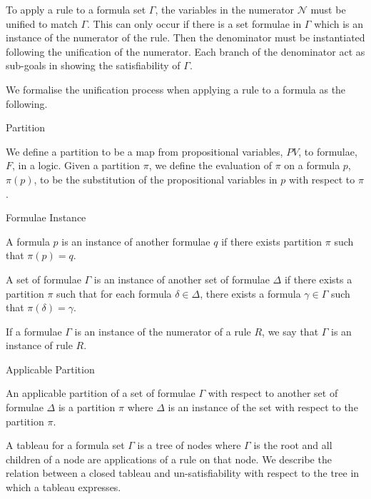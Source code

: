 \documentclass{llncs}
\begin{document}
To apply a rule to a formula set $\Gamma$, the variables in the numerator
$\mathcal{N}$ must be unified to match $\Gamma$. This can only occur if there
is a set formulae in $\Gamma$ which is an instance of the numerator of the
rule. Then the denominator must be instantiated following the unification of
the numerator. Each branch of the denominator act as sub-goals in showing the
satisfiability of $\Gamma$.

We formalise the unification process when applying a rule to a formula as the
following.

\begin{definition}{Partition}\label{Partition}

We define a partition to be a map from propositional variables, $PV$, to
formulae, $F$, in a logic. Given a partition $\pi$, we define the evaluation of
$\pi$ on a formula $p$, $\pi(p)$, to be the substitution of the propositional
variables in $p$ with respect to $\pi$.
\end{definition}

\begin{definition}{Formulae Instance}\label{Formulae Instance}

A formula $p$ is an instance of another formulae $q$ if there exists partition
$\pi$ such that $\pi(p) = q$.

A set of formulae $\Gamma$ is an instance of another set of formulae
$\Delta$ if there exists a partition $\pi$ such that for each formula $\delta
\in \Delta$, there exists a formula $\gamma \in \Gamma$ such that $\pi(\delta)
= \gamma$.

If a formulae $\Gamma$ is an instance of the numerator of a rule $R$, we say
that $\Gamma$ is an instance of rule $R$.
\end{definition}

\begin{definition}{Applicable Partition}\label{Applicable Partition}

An applicable partition of a set of formulae $\Gamma$ with respect to another
set of formulae $\Delta$ is a partition $\pi$ where $\Delta$ is an instance of
the set with respect to the partition $\pi$.
\end{definition}

A tableau for a formula set $\Gamma$ is a tree of nodes where $\Gamma$ is the
root and all children of a node are applications of a rule on that node.
We describe the relation between a closed tableau and un-satisfiability with
respect to the tree in which a tableau expresses.
\end{document}
